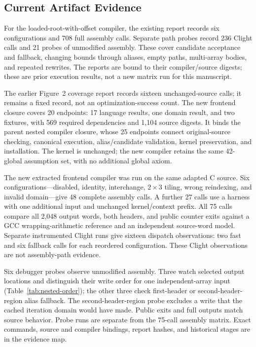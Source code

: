 \subsection{Current Artifact Evidence}

For the loaded-root-with-offset compiler, the existing report records six
configurations and 708 full assembly calls. Separate path probes record 236
Clight calls and 21 probes of unmodified assembly. These cover candidate
acceptance and fallback, changing bounds through aliases, empty paths,
multi-array bodies, and repeated rewrites. The reports are bound to their
compiler/source digests; these are prior execution results, not a new matrix run
for this manuscript.

The earlier Figure~2 coverage report records sixteen unchanged-source calls;
it remains a fixed record, not an optimization-success count. The new frontend
closure covers 20 endpoints: 17 language results, one domain result, and two
fixtures, with 569 required dependencies and 1,104 source digests. It binds the
parent nested compiler closure, whose 25 endpoints connect original-source
checking, canonical execution, alias/candidate validation, kernel preservation,
and installation. The kernel is unchanged; the new compiler retains the same
42-global assumption set, with no additional global axiom.

The new extracted frontend compiler was run on the same adapted C source.
Six configurations---disabled, identity, interchange, $2\times3$ tiling, wrong
reindexing, and invalid domain---give 48 complete assembly calls. A further 27
calls use a harness with one additional input and unchanged kernel/context
prefix. All 75 calls compare all 2,048 output words, both headers, and public
counter exits against a GCC wrapping-arithmetic reference and an independent
source-word model. Separate instrumented Clight runs give sixteen dispatch
observations: two fast and six fallback calls for each reordered configuration.
These Clight observations are not assembly-path evidence.

Six debugger probes observe unmodified assembly. Three watch selected output
locations and distinguish their write order for one independent-array input
(Table~\ref{tab:nested-order}); the
other three check first-header or second-header-region alias fallback. The
second-header-region probe excludes a write that the cached iteration domain
would have made. Public exits and full outputs match source behavior. Probe
runs are separate from the 75-call assembly matrix. Exact commands, source and
compiler bindings, report hashes, and historical stages are in the evidence map.

